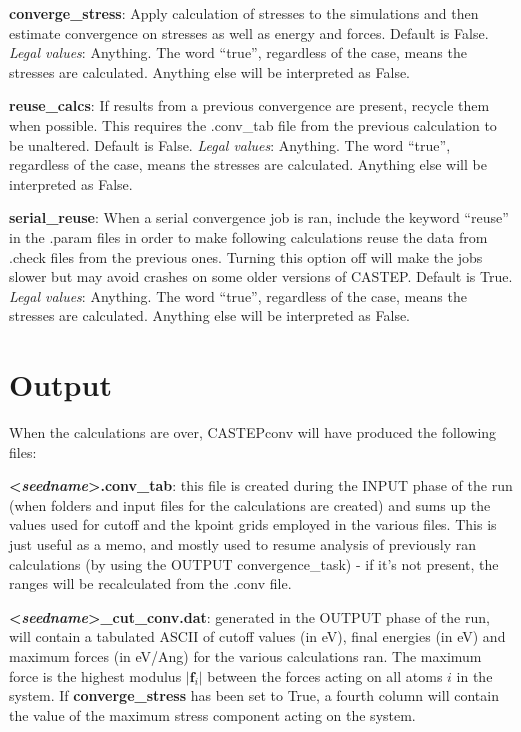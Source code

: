 \documentclass[10pt]{article}
\begin{document}
\textbf{converge\_stress}: Apply calculation of stresses to the simulations and then estimate convergence on stresses as well as energy and forces. Default is False.\newline
\textit{Legal values}: Anything. The word ``true'', regardless of the case, means the stresses are calculated. Anything else will be interpreted as False.\newline

\textbf{reuse\_calcs}: If results from a previous convergence are present, recycle them when possible. This requires the .conv\_tab file from the previous calculation to be unaltered. Default is False.\newline
\textit{Legal values}: Anything. The word ``true'', regardless of the case, means the stresses are calculated. Anything else will be interpreted as False.\newline

\textbf{serial\_reuse}: When a serial convergence job is ran, include the keyword ``reuse'' in the .param files in order to make following calculations reuse the data from .check files from the previous ones. Turning this option off will make the jobs slower but may avoid crashes on some older versions of CASTEP. Default is True.\newline
\textit{Legal values}: Anything. The word ``true'', regardless of the case, means the stresses are calculated. Anything else will be interpreted as False.\newline

\section{Output}

When the calculations are over, CASTEPconv will have produced the following files:

\textbf{\textless \textit{seedname}\textgreater.conv\_tab}: this file is created during the INPUT phase of the run (when folders and input files for the calculations are created) and sums up the values used for cutoff and the kpoint grids employed in the various files. This is just useful as a memo, and mostly used to resume analysis of previously ran calculations (by using the OUTPUT convergence\_task) - if it's not present, the ranges will be recalculated from the .conv file.

\textbf{\textless \textit{seedname}\textgreater\_cut\_conv.dat}: generated in the OUTPUT phase of the run, will contain a tabulated ASCII of cutoff values (in eV), final energies (in eV) and maximum forces (in eV/Ang) for the various calculations ran. The maximum force is the highest modulus $|\mathbf{f}_i|$ between the forces acting on all atoms $i$ in the system. If \textbf{converge\_stress} has been set to True, a fourth column will contain the value of the maximum stress component acting on the system.
\end{document}
